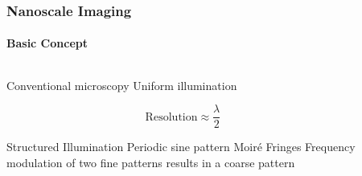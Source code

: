 \documentclass[mathserif,16pt,xcolor=table]{beamer}
\begin{document}
      \begin{frame}
        \frametitle{Nanoscale Imaging}
        \framesubtitle{Basic Concept}
        \begin{columns}[T] %
          \begin{column}{.45\textwidth}
            \begin{outline}[itemize]
              \1 Conventional microscopy
                \2 Uniform illumination
            \end{outline}
            \begin{equation} \nonumber
              \mathrm {Resolution} \approx \frac{\lambda}{2}
            \end{equation}
            \begin{outline}[itemize]
              \1 Structured Illumination
                \2 Periodic sine pattern
              \1 Moiré Fringes
                \2 Frequency modulation of two fine patterns results in a coarse pattern
            \end{outline}
          \end{column}
          \begin{column}[T]{.55\textwidth}
            \begin{center}
              \begin{figure}[t!]
                \vspace*{-2cm}
                \centering
                \subfloat{\scalebox{.07}{}
                \label{fig:test}} \hfil
                \subfloat{\scalebox{.07}{}
                \label{fig:sim_hi}}
              \end{figure}
              \begin{figure}
                \vspace*{-.5cm}
                \centering
                \def\svgwidth{.6\linewidth}
                
              \end{figure}
            \end{center}
            \end{column}%
          \end{columns}
        \end{frame}
\end{document}
